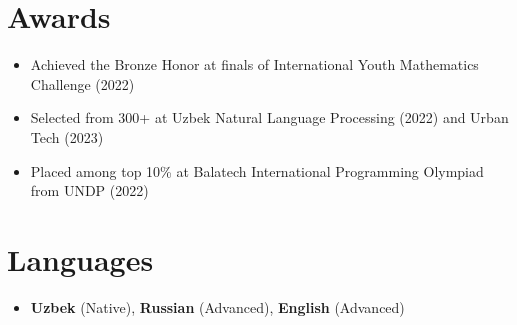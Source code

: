 \documentclass[letterpaper,11pt]{article}
\newcommand{\resumeItem}[1]{
  \item\small{
    {#1 \vspace{-2pt}}
  }
}
\newcommand{\resumeSubHeadingListStart}{\begin{itemize}[leftmargin=0.15in, label={}]}
\newcommand{\resumeSubHeadingListEnd}{\end{itemize}}
\newcommand{\resumeItemListStart}{\begin{itemize}}
\newcommand{\resumeItemListEnd}{\end{itemize}\vspace{-5pt}}
\begin{document}
\section{Awards}
\resumeSubHeadingListStart
    \resumeItemListStart
        \resumeItem{Achieved the Bronze Honor at finals of International Youth Mathematics Challenge (2022)}
        \resumeItem{Selected from 300+ at Uzbek Natural Language Processing (2022) and Urban Tech (2023) }
        \resumeItem{Placed among top 10\% at Balatech International Programming Olympiad from UNDP (2022)}
      \resumeItemListEnd
\resumeSubHeadingListEnd

\section{Languages}
\resumeSubHeadingListStart
    \resumeItemListStart
        \resumeItem{\textbf{Uzbek} (Native), \textbf{Russian} (Advanced), \textbf{English} (Advanced)}
      \resumeItemListEnd
\resumeSubHeadingListEnd
\end{document}
